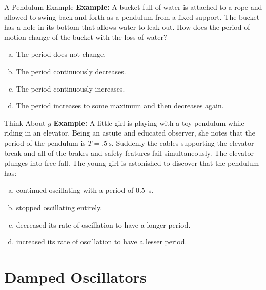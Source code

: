 \documentclass[12pt,compress,aspectratio=169]{beamer}
\begin{document}
\begin{frame}{A Pendulum Example}
  \textbf{Example:} A bucket full of water is attached to a rope and allowed
  to swing back and forth as a pendulum from a fixed support. The bucket has a
  hole in its bottom that allows water to leak out. How does the period of
  motion change of the bucket with the loss of water?
  \begin{enumerate}[(a)]
  \item The period does not change.
  \item The period continuously decreases.
  \item The period continuously increases.
  \item The period increases to some maximum and then decreases again.
  \end{enumerate}
\end{frame}



\begin{frame}{Think About $g$}
  \textbf{Example:} A little girl is playing with a toy pendulum while riding
  in an elevator. Being an astute and educated observer, she notes that the 
  period of the pendulum is $T=\SI{.5}\second$. Suddenly the cables
  supporting the elevator break and all  of the brakes and safety features fail
  simultaneously. The elevator plunges into free fall. The young girl is
  astonished to discover that the pendulum has:
  \begin{enumerate}[(a)]
  \item continued oscillating with a period of \SI{.5}\second.
  \item stopped oscillating entirely.
  \item decreased its rate of oscillation to have a longer period.
  \item increased its rate of oscillation to have a lesser period.
  \end{enumerate}
\end{frame}



\section{Damped Oscillators}
\end{document}
